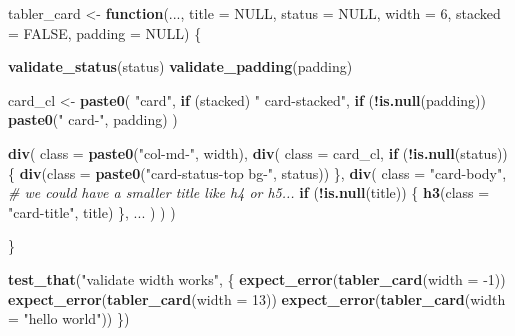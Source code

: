 \documentclass[
]{book}
\newenvironment{Shaded}{\begin{snugshade}}{\end{snugshade}}
\newcommand{\CommentTok}[1]{\textcolor[rgb]{0.56,0.35,0.01}{\textit{#1}}}
\newcommand{\ControlFlowTok}[1]{\textcolor[rgb]{0.13,0.29,0.53}{\textbf{#1}}}
\newcommand{\DataTypeTok}[1]{\textcolor[rgb]{0.13,0.29,0.53}{#1}}
\newcommand{\DecValTok}[1]{\textcolor[rgb]{0.00,0.00,0.81}{#1}}
\newcommand{\KeywordTok}[1]{\textcolor[rgb]{0.13,0.29,0.53}{\textbf{#1}}}
\newcommand{\NormalTok}[1]{#1}
\newcommand{\OperatorTok}[1]{\textcolor[rgb]{0.81,0.36,0.00}{\textbf{#1}}}
\newcommand{\OtherTok}[1]{\textcolor[rgb]{0.56,0.35,0.01}{#1}}
\newcommand{\StringTok}[1]{\textcolor[rgb]{0.31,0.60,0.02}{#1}}
\begin{document}
\begin{Shaded}
\begin{Highlighting}[]
\NormalTok{tabler_card <-}\StringTok{ }\ControlFlowTok{function}\NormalTok{(..., }\DataTypeTok{title =} \OtherTok{NULL}\NormalTok{, }\DataTypeTok{status =} \OtherTok{NULL}\NormalTok{, }\DataTypeTok{width =} \DecValTok{6}\NormalTok{, }\DataTypeTok{stacked =} \OtherTok{FALSE}\NormalTok{, }\DataTypeTok{padding =} \OtherTok{NULL}\NormalTok{) \{}
  
  \KeywordTok{validate_status}\NormalTok{(status)}
  \KeywordTok{validate_padding}\NormalTok{(padding)}
  
\NormalTok{  card_cl <-}\StringTok{ }\KeywordTok{paste0}\NormalTok{(}
    \StringTok{"card"}\NormalTok{, }
    \ControlFlowTok{if}\NormalTok{ (stacked) }\StringTok{" card-stacked"}\NormalTok{,}
    \ControlFlowTok{if}\NormalTok{ (}\OperatorTok{!}\KeywordTok{is.null}\NormalTok{(padding)) }\KeywordTok{paste0}\NormalTok{(}\StringTok{" card-"}\NormalTok{, padding)}
\NormalTok{  )}
  
  \KeywordTok{div}\NormalTok{(}
    \DataTypeTok{class =} \KeywordTok{paste0}\NormalTok{(}\StringTok{"col-md-"}\NormalTok{, width),}
    \KeywordTok{div}\NormalTok{(}
      \DataTypeTok{class =}\NormalTok{ card_cl,}
      \ControlFlowTok{if}\NormalTok{ (}\OperatorTok{!}\KeywordTok{is.null}\NormalTok{(status)) \{}
        \KeywordTok{div}\NormalTok{(}\DataTypeTok{class =} \KeywordTok{paste0}\NormalTok{(}\StringTok{"card-status-top bg-"}\NormalTok{, status))}
\NormalTok{      \},}
      \KeywordTok{div}\NormalTok{(}
        \DataTypeTok{class =} \StringTok{"card-body"}\NormalTok{,}
        \CommentTok{# we could have a smaller title like h4 or h5...}
        \ControlFlowTok{if}\NormalTok{ (}\OperatorTok{!}\KeywordTok{is.null}\NormalTok{(title)) \{}
          \KeywordTok{h3}\NormalTok{(}\DataTypeTok{class =} \StringTok{"card-title"}\NormalTok{, title)}
\NormalTok{        \},}
\NormalTok{        ...}
\NormalTok{      )}
\NormalTok{    )}
\NormalTok{  )}
  
\NormalTok{\}}


\KeywordTok{test_that}\NormalTok{(}\StringTok{"validate width works"}\NormalTok{, \{}
  \KeywordTok{expect_error}\NormalTok{(}\KeywordTok{tabler_card}\NormalTok{(}\DataTypeTok{width =} \DecValTok{-1}\NormalTok{))}
  \KeywordTok{expect_error}\NormalTok{(}\KeywordTok{tabler_card}\NormalTok{(}\DataTypeTok{width =} \DecValTok{13}\NormalTok{))}
  \KeywordTok{expect_error}\NormalTok{(}\KeywordTok{tabler_card}\NormalTok{(}\DataTypeTok{width =} \StringTok{"hello world"}\NormalTok{))}
\NormalTok{\})}
\end{Highlighting}
\end{Shaded}
\end{document}
